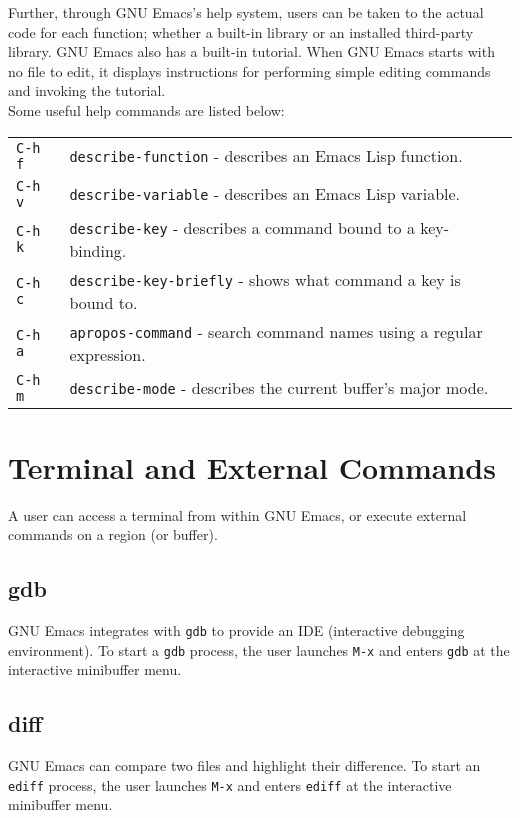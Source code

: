\documentclass[12pt,a4paper,oneside]{article}
\begin{document}
Further, through GNU Emacs's help system, users can be taken to the actual code for each function; whether a built-in library or an installed third-party library. GNU Emacs also has a built-in tutorial. When GNU Emacs starts with no file to edit, it displays instructions for performing simple editing commands and invoking the tutorial.\\

Some useful help commands are listed below:

\begin{tabular}{@{}ll@{}}
  \texttt{C-h f} & \texttt{describe-function} - describes an Emacs Lisp function.\\
  \texttt{C-h v} & \texttt{describe-variable} - describes an Emacs Lisp variable.\\
  \texttt{C-h k} & \texttt{describe-key} - describes a command bound to a key-binding.\\
  \texttt{C-h c} & \texttt{describe-key-briefly} - shows what command a key is bound to.\\
  \texttt{C-h a} & \texttt{apropos-command} - search command names using a regular expression.\\
  \texttt{C-h m} & \texttt{describe-mode} - describes the current buffer's major mode.\\
\end{tabular}


\section{Terminal and External Commands}
A user can access a terminal from within GNU Emacs, or execute external commands on a region (or buffer).

\subsection{gdb}
GNU Emacs integrates with \texttt{gdb} to provide an IDE (interactive debugging environment). To start a \texttt{gdb} process, the user launches \texttt{M-x} and enters \texttt{gdb} at the interactive minibuffer menu.

\subsection{diff}
GNU Emacs can compare two files and highlight their difference. To start an \texttt{ediff} process, the user launches \texttt{M-x} and enters \texttt{ediff} at the interactive minibuffer menu.
\end{document}
